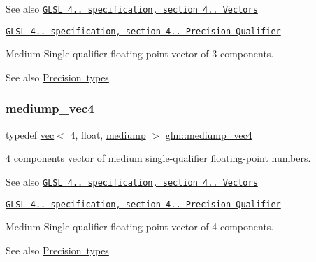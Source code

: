 \begin{DoxySeeAlso}{See also}
\href{http://www.opengl.org/registry/doc/GLSLangSpec.4.20.8.pdf}{\tt G\+L\+SL 4.. specification, section 4.. Vectors} 

\href{http://www.opengl.org/registry/doc/GLSLangSpec.4.20.8.pdf}{\tt G\+L\+SL 4.. specification, section 4.. Precision Qualifier}
\end{DoxySeeAlso}
Medium Single-\/qualifier floating-\/point vector of 3 components. \begin{DoxySeeAlso}{See also}
\mbox{\hyperlink{group__core__precision}{Precision types}} 
\end{DoxySeeAlso}
\mbox{\label{group__core__precision_gaf165f9c36fb7832b79ddf7d56af3c54f}} 
\subsubsection{\texorpdfstring{mediump\+\_\+vec4}{mediump\_vec4}}
{\footnotesize\ttfamily typedef \mbox{\hyperlink{structglm_1_1vec}{vec}}$<$ 4, float, \mbox{\hyperlink{namespaceglm_a36ed105b07c7746804d7fdc7cc90ff25a6416f3ea0c9025fb21ed50c4d6620482}{mediump}} $>$ \mbox{\hyperlink{group__core__precision_gaf165f9c36fb7832b79ddf7d56af3c54f}{glm\+::mediump\+\_\+vec4}}}

4 components vector of medium single-\/qualifier floating-\/point numbers.

\begin{DoxySeeAlso}{See also}
\href{http://www.opengl.org/registry/doc/GLSLangSpec.4.20.8.pdf}{\tt G\+L\+SL 4.. specification, section 4.. Vectors} 

\href{http://www.opengl.org/registry/doc/GLSLangSpec.4.20.8.pdf}{\tt G\+L\+SL 4.. specification, section 4.. Precision Qualifier}
\end{DoxySeeAlso}
Medium Single-\/qualifier floating-\/point vector of 4 components. \begin{DoxySeeAlso}{See also}
\mbox{\hyperlink{group__core__precision}{Precision types}} 
\end{DoxySeeAlso}
\mbox{\label{group__core__precision_ga4fd29415871152bfb5abd588334147c8}} 
